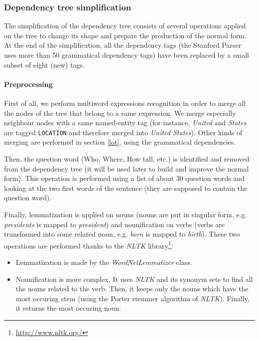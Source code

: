 
\subsubsection{Dependency tree simplification}
\label{dts}

The simplification of the dependency tree consists of several operations applied on the tree to change its shape and prepare the production of the normal form. At the end of the simplification, all the dependency tags (the Stanford Parser uses more than 50 grammatical dependency tags) have been replaced by a small subset of eight (new) tags.


\paragraph{Preprocessing}
\label{pre}

First of all, we perform multiword expressions recognition in order to merge all the nodes of the tree that belong to a same expression. We merge especially neighbour nodes with a same named-entity tag (for instance, \textit{United} and \textit{States} are tagged \texttt{LOCATION} and therefore merged into \textit{United States}). Other kinds of merging are performed in section \ref{lot}, using the grammatical dependencies.

Then, the question word (Who, Where, How tall, etc.) is identified and removed from the dependency tree (it will be used later to build and improve the normal form). This operation is performed using a list of about 30 question words and looking at the two first words of the sentence (they are supposed to contain the question word).

Finally, lemmatization is applied on nouns (nouns are put in singular form, e.g. \textit{presidents} is mapped to \textit{president}) and nounification on verbs (verbs are transformed into some related noun, e.g. \textit{born} is mapped to \textit{birth}).
These two operations are performed thanks to the \emph{NLTK} library\footnote{\url{http://www.nltk.org/}}:
\begin{itemize}
    \item Lemmatization is made by the \emph{WordNetLemmatizer} class.
    \item Nounification is more complex. It uses \emph{NLTK} and its synonym sets to find all the nouns related to the verb. Then, it keeps only the nouns which have the most occuring stem (using the Porter stemmer algorithm of \emph{NLTK}). Finally, it returns the most occuring noun.
\end{itemize}

